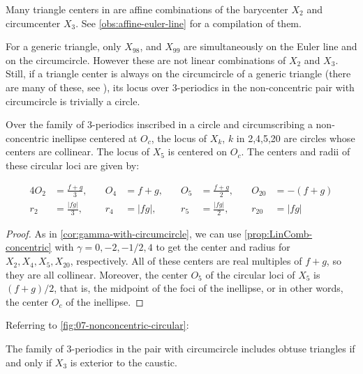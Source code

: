 Many triangle centers in \cite{etc} are affine combinations of the barycenter $X_2$ and circumcenter $X_3$. See   \cref{obs:affine-euler-line} for a compilation of them.

\begin{observation}
For a generic triangle, only $X_{98}$, and $X_{99}$ are simultaneously on the Euler line and on the circumcircle. However these are not linear combinations of $X_2$ and $X_3$. Still, if a triangle center is always on the circumcircle of a generic triangle (there are many of these, see \cite[Circumcircle]{mw}), its locus over 3-periodics in the non-concentric pair with circumcircle is trivially a circle.
\end{observation}

 
\begin{corollary}
 Over the family of 3-periodics inscribed in a circle and circumscribing a non-concentric inellipse centered at $O_c$, the locus of $X_k$, $k$ in 2,4,5,20 are circles whose centers are collinear. The locus of $X_5$ is centered on $O_c$. The centers and radii of these circular loci are given by:

\begin{alignat*}{4}
    O_2&=\frac{f+g}{3},\quad& O_4&=f+g,\quad&O_5&=\frac{f+g}{2},\quad&O_{20}&=-(f+g)\\
    r_2&=\frac{|f g|}{3},\quad&r_4 &= |f g|,\quad&r_5 &= \frac{|f g|}{2},\quad& r_{20}&= |f g|
\end{alignat*}

\end{corollary}

\begin{proof}
As in  \cref{cor:gamma-with-circumcircle}, we can use  \cref{prop:LinComb-concentric} with $\gamma=0,-2,-1/2,4$ to get the center and radius for $X_2,X_4,X_5,X_{20}$, respectively. All of these centers are real multiples of $f+g$, so they are all collinear. Moreover, the center $O_5$ of the circular loci of $X_5$ is $(f+g)/2$, that is, the midpoint of the foci of the inellipse, or in other words, the center $O_c$ of the inellipse.
\end{proof}
 
Referring to  \cref{fig:07-nonconcentric-circular}:

\begin{observation}
The family of 3-periodics in the pair with circumcircle includes obtuse triangles if and only if $X_3$ is exterior to the caustic. \end{observation}

